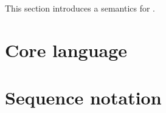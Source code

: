 
This section introduces a \tockcsp{} semantics for \langname.

\section{Core language}\label{sec:semantics-tockcsp-core}

\section{Sequence notation}\label{sec:semantics-tockcsp-seq}


